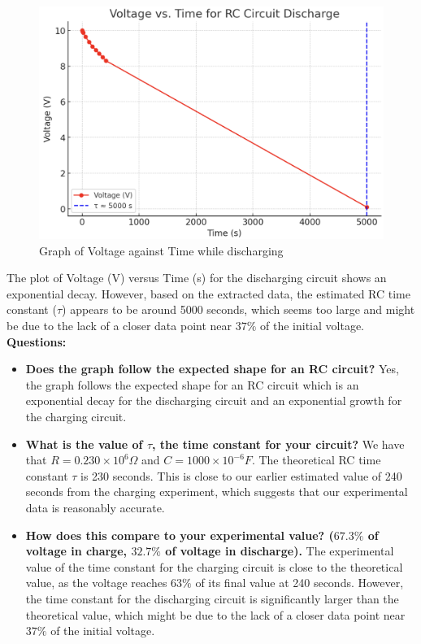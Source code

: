\documentclass[a4paper]{article}
\begin{document}
\begin{figure}[H]
    \centering
    \includegraphics[width=1\textwidth]{Exp52.png}
    \caption{Graph of Voltage against Time while discharging}
\end{figure}
\noindent
The plot of Voltage (V) versus Time (s) for the discharging circuit shows an exponential decay. However, based on the extracted data, the estimated RC time constant ($\tau$) appears to be around 5000 seconds, which seems too large and might be due to the lack of a closer data point near $37\%$ of the initial voltage.
\\
\textbf{Questions:}
\begin{itemize}
    \item \textbf{Does the graph follow the expected shape for an RC circuit?} Yes, the graph follows the expected shape for an RC circuit which is an exponential decay for the discharging circuit and an exponential growth for the charging circuit.
    \item \textbf{What is the value of $\tau$, the time constant for your circuit?} We have that $R = 0.230 \times 10^6 \Omega$ and $C = 1000 \times 10^{-6} F$. The theoretical RC time constant $\tau$ is 230 seconds. This is close to our earlier estimated value of 240 seconds from the charging experiment, which suggests that our experimental data is reasonably accurate.
    \item \textbf{How does this compare to your experimental value? ($67.3\%$ of voltage in charge, $32.7\%$ of voltage in discharge).} The experimental value of the time constant for the charging circuit is close to the theoretical value, as the voltage reaches $63\%$ of its final value at 240 seconds. However, the time constant for the discharging circuit is significantly larger than the theoretical value, which might be due to the lack of a closer data point near $37\%$ of the initial voltage.
\end{itemize}
\end{document}
